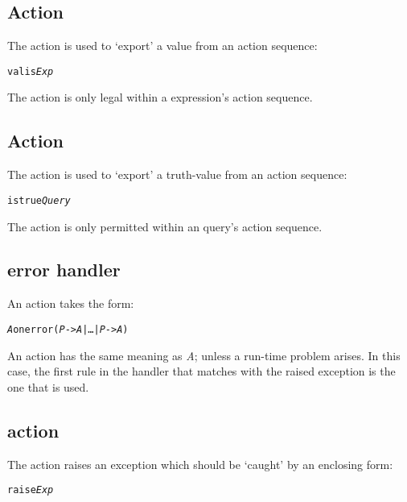 \subsection{ Action}
\label{action:valis}

The  action is used to `export' a value from an action sequence:
\begin{alltt}
valis \emph{Exp}
\end{alltt}
The  action is only legal within a  expression's action sequence.


\subsection{ Action}
\label{action:istrue}

The  action is used to `export' a truth-value from an action sequence:
\begin{alltt}
istrue \emph{Query}
\end{alltt}
The  action is only permitted within an  query's action sequence.

\subsection{error handler}
\label{action:errorhandler}

An  action takes the form:

\begin{alltt}
\emph{A} onerror (\emph{P} -> \emph{A} | \ldots{} | \emph{P\subn} -> \emph{A\subn})
\end{alltt}
An  action has the same meaning as \emph{A}; unless a run-time problem arises. In this case, the first rule in the handler that matches with the raised exception is the one that is used.

\subsection{ action}
\label{action:raise}

The  action raises an exception which should be `caught' by an enclosing  form:
\begin{alltt}
raise \emph{Exp}
\end{alltt}

